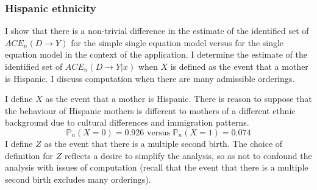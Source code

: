\documentclass[12pt,a4paper,twoside]{article}
\numberwithin{equation}{section}
\begin{document}
\subsubsection{Hispanic ethnicity}
I show that there is a non-trivial difference in the estimate of the identified set of $ACE_n(D\rightarrow Y)$ for the simple single equation model versus for the single equation model in the context of the application. I determine the estimate of the identified set of $ACE_n(D\rightarrow Y|x)$ when $X$ is defined as the event that a mother is Hispanic. I discuss computation when there are many admissible orderings. 

I define $X$ as the event that a mother is Hispanic. There is reason to suppose that the behaviour of Hispanic mothers is different to mothers of a different ethnic background due to cultural differences and immigration patterns.   
\[\mathbb{P}_n(X=0)=0.926\text{ versus }\mathbb{P}_n(X=1)=0.074\] 
I define $Z$ as the event that there is a multiple second birth. The choice of definition for $Z$ reflects a desire to simplify the analysis, so as not to confound the analysis with issues of computation (recall that the event that there is a multiple second birth excludes many orderings).
\end{document}
